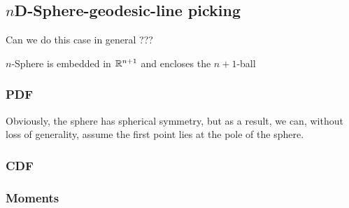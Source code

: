 \subsection{$n$D-Sphere-geodesic-line picking}
\label{sec:nsphere_geodesic_line}

Can we do this case in general ???

$n$-Sphere is embedded in $\mathbb{R}^{n+1}$ and encloses the $n+1$-ball

\subsubsection{PDF}

Obviously, the sphere has spherical symmetry, but as a result, we can,
without loss of generality, assume the first point lies at the pole of
the sphere.




\subsubsection{CDF}


\subsubsection{Moments}



